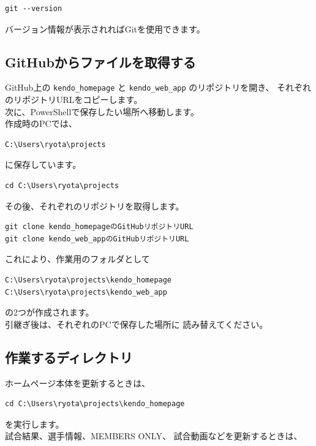 \documentclass[a4paper,11pt]{ltjsarticle}
\begin{document}
\begin{lstlisting}
git --version
\end{lstlisting}

バージョン情報が表示されればGitを使用できます。


\subsection{GitHubからファイルを取得する}

GitHub上の
\texttt{kendo\_homepage} と
\texttt{kendo\_web\_app} のリポジトリを開き、
それぞれのリポジトリURLをコピーします。\\
次に、PowerShellで保存したい場所へ移動します。\\
作成時のPCでは、

\begin{lstlisting}
C:\Users\ryota\projects
\end{lstlisting}

に保存しています。

\begin{lstlisting}
cd C:\Users\ryota\projects
\end{lstlisting}

その後、それぞれのリポジトリを取得します。

\begin{lstlisting}
git clone kendo_homepageのGitHubリポジトリURL
git clone kendo_web_appのGitHubリポジトリURL
\end{lstlisting}

これにより、作業用のフォルダとして

\begin{lstlisting}
C:\Users\ryota\projects\kendo_homepage
C:\Users\ryota\projects\kendo_web_app
\end{lstlisting}

の2つが作成されます。\\
引継ぎ後は、それぞれのPCで保存した場所に
読み替えてください。


\subsection{作業するディレクトリ}

ホームページ本体を更新するときは、

\begin{lstlisting}
cd C:\Users\ryota\projects\kendo_homepage
\end{lstlisting}

を実行します。\\
試合結果、選手情報、MEMBERS ONLY、
試合動画などを更新するときは、
\end{document}
